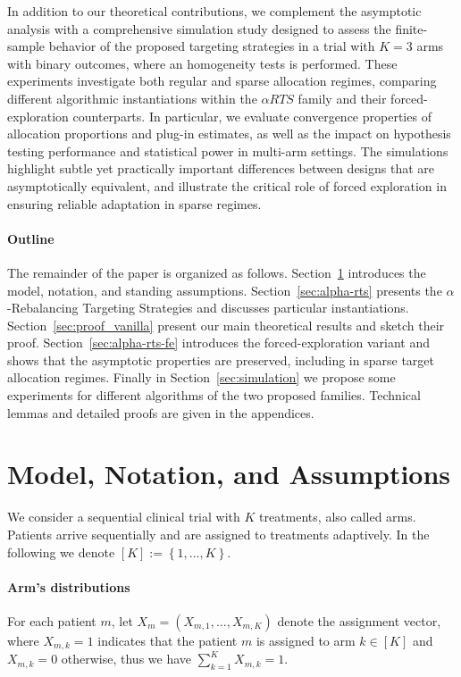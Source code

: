 \documentclass[11pt]{article}
\theoremstyle{plain}
\theoremstyle{definition}
\begin{document}
In addition to our theoretical contributions, we complement the asymptotic analysis with a comprehensive simulation study designed to assess the finite-sample behavior of the proposed targeting strategies in a trial with $K=3$ arms with binary outcomes, where an homogeneity tests is performed. These experiments investigate both regular and sparse allocation regimes, comparing different algorithmic instantiations within the \(\alpha RTS\) family and their forced-exploration counterparts. In particular, we evaluate convergence properties of allocation proportions and plug-in estimates, as well as the impact on hypothesis testing performance and statistical power in multi-arm settings. The simulations highlight subtle yet practically important differences between designs that are asymptotically equivalent, and illustrate the critical role of forced exploration in ensuring reliable adaptation in sparse regimes.


\paragraph*{Outline}
The remainder of the paper is organized as follows. Section~\ref{sec:notations} introduces the model, notation, and standing assumptions. Section~\ref{sec:alpha-rts} presents the $\alpha$-Rebalancing Targeting Strategies and discusses particular instantiations. Section~\ref{sec:proof_vanilla} present our main theoretical results and sketch their proof. Section~\ref{sec:alpha-rts-fe} introduces the forced-exploration variant and shows that the asymptotic properties are preserved, including in sparse target allocation regimes. Finally in Section~\ref{sec:simulation} we propose some experiments for different algorithms of the two proposed families. Technical lemmas and detailed proofs are given in the appendices.


	
	
	\section{Model, Notation, and Assumptions}\label{sec:notations}
We consider a sequential clinical trial with $K$ treatments, also called arms. Patients arrive sequentially and are assigned to treatments adaptively. In the following we denote \([K]:= \left\{1, \dots, K\right\}\).

\paragraph*{Arm's distributions}
For each patient $m$, let \(X_m = (X_{m,1}, \ldots, X_{m,K})\) denote the assignment vector, where $X_{m,k}=1$ indicates that the patient \(m\) is assigned to arm \(k \in [K]\) and $X_{m,k}=0$ otherwise, thus we have $\sum_{k=1}^{K} X_{m,k} = 1$.
\end{document}

